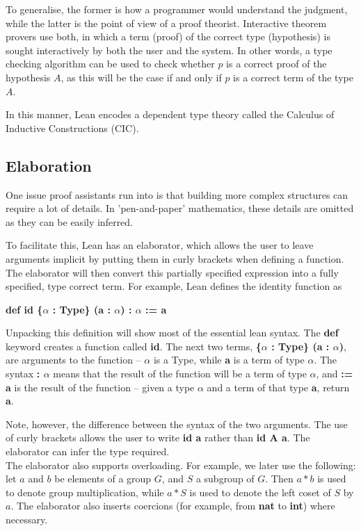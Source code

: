 \documentclass[runningheads,a4paper]{llncs}
\renewcommand{\a}{\alpha}
\renewcommand{\-}{\setminus}
\begin{document}
To generalise, the former is how a programmer would understand the judgment, while the latter is the point of view of a proof theorist. Interactive theorem provers use both, in which a term (proof) of the correct type (hypothesis) is sought interactively by both the user and the system. In other words, a type checking algorithm can be used to check whether $p$ is a correct proof of the hypothesis $A$, as this will be the case if and only if $p$ is a correct term of the type $A$.

In this manner, Lean encodes a dependent type theory called the Calculus of Inductive Constructions (CIC).

\subsection{Elaboration}

One issue proof assistants run into is that building more complex structures can require a lot of details. In 'pen-and-paper' mathematics, these details are omitted as they can be easily inferred.

To facilitate this, Lean has an elaborator, which allows the user to leave arguments implicit by putting them in curly brackets when defining a function. The elaborator will then convert this partially specified expression into a fully specified, type correct term. For example, Lean defines the identity function as

\vspace{2 mm}
\hspace{2 em}\textbf{def id \{$\a$ : Type\} (a : $\a$) : $\a$ := a}
\vspace{2 mm}

Unpacking this definition will show most of the essential lean syntax. The \textbf{def} keyword creates a function called \textbf{id}. The next two terms, \textbf{\{$\a$ : Type\} (a : $\a$)}, are arguments to the function -- $\a$ is a Type, while \textbf{a} is a term of type $\a$. The syntax \textbf{: $\a$} means that the result of the function will be a term of type $\a$, and \textbf{:= a} is the result of the function -- given a type $\a$ and a term of that type \textbf{a}, return \textbf{a}.

Note, however, the difference between the syntax of the two arguments. The use of curly brackets allows the user to write \textbf{id a} rather than \textbf{id A a}. The elaborator can infer the type required.\\

The elaborator also supports overloading. For example, we later use the following: let $a$ and $b$ be elements of a group $G$, and $S$ a subgroup of $G$. Then $a*b$ is used to denote group multiplication, while $a * S$ is used to denote the left coset of $S$ by $a$. The elaborator also inserts coercions (for example, from \textbf{nat} to \textbf{int}) where necessary.
\end{document}
